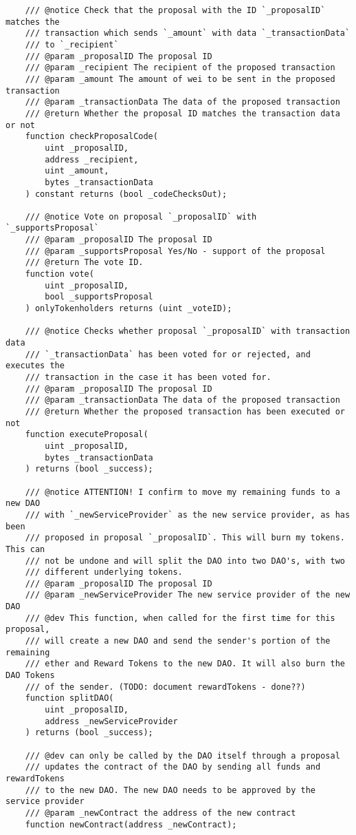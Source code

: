 \documentclass[9pt,oneside]{amsart}
\begin{document}
\begin{appendix}
\begin{verbatim}
    /// @notice Check that the proposal with the ID `_proposalID` matches the
    /// transaction which sends `_amount` with data `_transactionData`
    /// to `_recipient`
    /// @param _proposalID The proposal ID
    /// @param _recipient The recipient of the proposed transaction
    /// @param _amount The amount of wei to be sent in the proposed transaction
    /// @param _transactionData The data of the proposed transaction
    /// @return Whether the proposal ID matches the transaction data or not
    function checkProposalCode(
        uint _proposalID,
        address _recipient,
        uint _amount,
        bytes _transactionData
    ) constant returns (bool _codeChecksOut);

    /// @notice Vote on proposal `_proposalID` with `_supportsProposal`
    /// @param _proposalID The proposal ID
    /// @param _supportsProposal Yes/No - support of the proposal
    /// @return The vote ID.
    function vote(
        uint _proposalID,
        bool _supportsProposal
    ) onlyTokenholders returns (uint _voteID);

    /// @notice Checks whether proposal `_proposalID` with transaction data
    /// `_transactionData` has been voted for or rejected, and executes the
    /// transaction in the case it has been voted for.
    /// @param _proposalID The proposal ID
    /// @param _transactionData The data of the proposed transaction
    /// @return Whether the proposed transaction has been executed or not
    function executeProposal(
        uint _proposalID,
        bytes _transactionData
    ) returns (bool _success);

    /// @notice ATTENTION! I confirm to move my remaining funds to a new DAO
    /// with `_newServiceProvider` as the new service provider, as has been
    /// proposed in proposal `_proposalID`. This will burn my tokens. This can
    /// not be undone and will split the DAO into two DAO's, with two
    /// different underlying tokens.
    /// @param _proposalID The proposal ID
    /// @param _newServiceProvider The new service provider of the new DAO
    /// @dev This function, when called for the first time for this proposal,
    /// will create a new DAO and send the sender's portion of the remaining
    /// ether and Reward Tokens to the new DAO. It will also burn the DAO Tokens
    /// of the sender. (TODO: document rewardTokens - done??)
    function splitDAO(
        uint _proposalID,
        address _newServiceProvider
    ) returns (bool _success);

    /// @dev can only be called by the DAO itself through a proposal
    /// updates the contract of the DAO by sending all funds and rewardTokens
    /// to the new DAO. The new DAO needs to be approved by the service provider
    /// @param _newContract the address of the new contract
    function newContract(address _newContract);



\end{verbatim}
\end{appendix}
\end{document}
